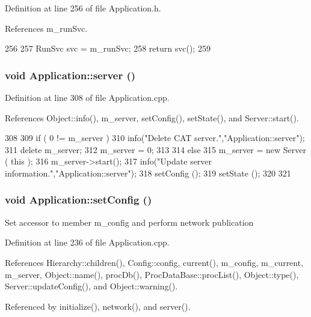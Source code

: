 Definition at line 256 of file Application.h.

References m\_\-runSvc.


\begin{DoxyCode}
256                        {
257     RunSvc svc = m_runSvc;
258     return svc();
259   }
\end{DoxyCode}
\hypertarget{classApplication_a1712ebe326b3d1855b839c59f52633d8}{
\subsubsection[{server}]{\setlength{\rightskip}{0pt plus 5cm}void Application::server ()}}
\label{classApplication_a1712ebe326b3d1855b839c59f52633d8}


Definition at line 308 of file Application.cpp.

References Object::info(), m\_\-server, setConfig(), setState(), and Server::start().


\begin{DoxyCode}
308                             {
309   if ( 0 != m_server ) {
310     info("Delete CAT server.","Application::server");
311     delete m_server;
312     m_server = 0;
313   }
314   else {
315     m_server = new Server ( this );
316     m_server->start();
317     info("Update server information.","Application::server");
318     setConfig ();
319     setState  ();
320   }
321 }
\end{DoxyCode}
\hypertarget{classApplication_a46614964f765fd5374b216582b599bcb}{
\subsubsection[{setConfig}]{\setlength{\rightskip}{0pt plus 5cm}void Application::setConfig ()}}
\label{classApplication_a46614964f765fd5374b216582b599bcb}
Set accessor to member m\_\-config and perform network publication 

Definition at line 236 of file Application.cpp.

References Hierarchy::children(), Config::config, current(), m\_\-config, m\_\-current, m\_\-server, Object::name(), procDb(), ProcDataBase::procList(), Object::type(), Server::updateConfig(), and Object::warning().

Referenced by initialize(), network(), and server().


